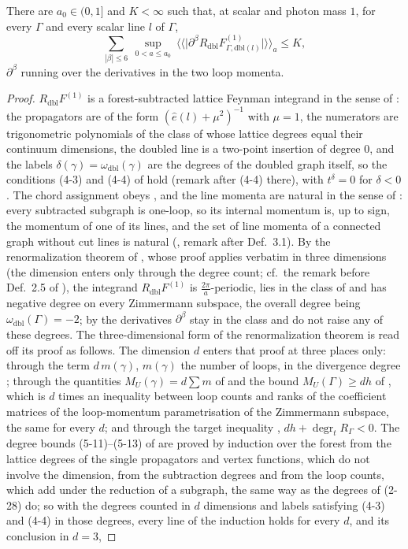 \begin{lemma}\label{lem:a05:H}
There are $a_0\in(0,1]$ and $K<\infty$ such that, at scalar and photon mass $1$, for every $\Gamma$ and every scalar line $l$ of $\Gamma$,
\[
\sum_{|\beta|\le6}\ \sup_{0<a\le a_0}\ \big\langle\big\langle\big|\partial^\beta R_{\mathrm{dbl}}F^{(1)}_{\Gamma,\mathrm{dbl}(l)}\big|\big\rangle\big\rangle_a\le K,
\]
$\partial^\beta$ running over the derivatives in the two loop momenta.
\end{lemma}
\begin{proof}
$R_{\mathrm{dbl}}F^{(1)}$ is a forest-subtracted lattice Feynman integrand in the sense of \cite{Rei88b}: the propagators are of the form $(\hat e(l)+\mu^2)^{-1}$ with $\mu=1$, the numerators are trigonometric polynomials of the class of \cite[Defs.~2.1--2.5]{Rei88} whose lattice degrees equal their continuum dimensions, the doubled line is a two-point insertion of degree $0$, and the labels $\delta(\gamma)=\omega_{\mathrm{dbl}}(\gamma)$ are the degrees of the doubled graph itself, so the conditions (4-3) and (4-4) of \cite{Rei88b} hold (remark after (4-4) there), with $t^\delta=0$ for $\delta<0$. The chord assignment obeys \cite[(2-24)]{Rei88b}, and the line momenta are natural in the sense of \cite[Def.~3.1]{Rei88}: every subtracted subgraph is one-loop, so its internal momentum is, up to sign, the momentum of one of its lines, and the set of line momenta of a connected graph without cut lines is natural (\cite{Rei88}, remark after Def.~3.1). By the renormalization theorem of \cite[Sects.~4--5]{Rei88b}, whose proof applies verbatim in three dimensions (the dimension enters only through the degree count; cf.\ the remark before Def.~2.5 of \cite{Rei88}), the integrand $R_{\mathrm{dbl}}F^{(1)}$ is $\frac{2\pi}a$-periodic, lies in the class of \cite{Rei88} and has negative degree on every Zimmermann subspace, the overall degree being $\omega_{\mathrm{dbl}}(\Gamma)=-2$; by \cite[Lemmas~2.1--2.2]{Rei88} the derivatives $\partial^\beta$ stay in the class and do not raise any of these degrees. The three-dimensional form of the renormalization theorem is read off its proof as follows. The dimension $d$ enters that proof at three places only: through the term $d\,m(\gamma)$, $m(\gamma)$ the number of loops, in the divergence degree \cite[(2-28), (2-31)]{Rei88b}; through the quantities $M_U(\gamma)=d\sum m$ of \cite[(5-10)]{Rei88b} and the bound $M_U(\Gamma)\ge dh$ of \cite[App.~C]{Rei88b}, which is $d$ times an inequality between loop counts and ranks of the coefficient matrices of the loop-momentum parametrisation of the Zimmermann subspace, the same for every $d$; and through the target inequality \cite[(5-5)]{Rei88b}, $dh+\operatorname{degr}_tR_\Gamma<0$. The degree bounds (5-11)--(5-13) of \cite[Lemma~5.2]{Rei88b} are proved by induction over the forest from the lattice degrees of the single propagators and vertex functions, which do not involve the dimension, from the subtraction degrees and from the loop counts, which add under the reduction of a subgraph, the same way as the degrees of (2-28) do; so with the degrees counted in $d$ dimensions and labels satisfying (4-3) and (4-4) in those degrees, every line of the induction holds for every $d$, and its conclusion in $d=3$, 
\end{proof}
